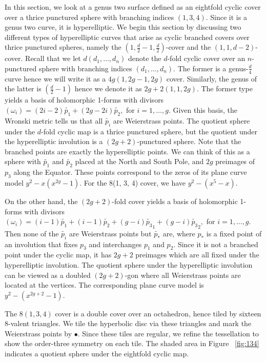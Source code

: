 \documentclass[12pt,reqno]{amsart}
\theoremstyle{definition}
\theoremstyle{remark}
\begin{document}
In this section, we look at a genus two surface defined as an eightfold cyclic cover over a thrice punctured sphere with branching indices $(1, 3, 4).$ Since it is a genus two curve, it is hyperelliptic. We begin this section by discussing two different types of hyperelliptic curves that arise as cyclic branched covers over thrice punctured spheres, namely the $(1, \frac{d}{2} - 1, \frac{d}{2})$-cover and the $(1, 1, d - 2)$-cover. Recall that we let $d (d_1, \ldots , d_n)$ denote the $d$-fold cyclic cover over an $n$-punctured sphere with branching indices $(d_1, \ldots , d_n).$ The former is a genus-$\frac{d}{4}$ curve hence we will write it as a $4 g (1, 2 g - 1, 2 g)$ cover. Similarly, the genus of the latter is $\left(\frac{d}{2} - 1\right)$ hence we denote it as $2 g + 2 (1, 1, 2 g).$ The former type yields a basis of holomorphic 1-forms with divisors $(\omega_i) = (2 i - 2) \widetilde{p_1} + (2 g - 2 i) \widetilde{p_2},$ for $i = 1, \ldots , g.$ Given this basis, the Wronski metric tells us that all $\widetilde{p_i}$ are Weierstrass points. The quotient sphere under the $d$-fold cyclic map is a thrice punctured sphere, but the quotient under the hyperelliptic involution is a $(2 g + 2)$-punctured sphere. Note that the branched points are exactly the hyperelliptic points. We can think of this as a sphere with $\widetilde{p_1}$ and $\widetilde{p_2}$ placed at the North and South Pole, and $2 g$ preimages of $p_3$ along the Equator. These points correspond to the zeros of its plane curve model $y^2 - x (x^{2 g} - 1).$ For the 8(1, 3, 4) cover, we have $y^2 - (x^5 - x).$

On the other hand, the $(2 g + 2)$-fold cover yields a basis of holomorphic 1-forms with divisors $(\omega_i) = (i - 1) \widetilde{p_1} + (i - 1) \widetilde{p_2} + (g - i) \widetilde{p_3}_1 + (g - i) \widetilde{p_3}_2,$ for $i = 1, \ldots , g.$ Then none of the $\widetilde{p_i}$ are Weierstrass points but $\widetilde{p_*}$ are, where $p_*$ is a fixed point of an involution that fixes $p_3$ and interchanges $p_1$ and $p_2.$ Since it is not a branched point under the cyclic map, it has $2 g + 2$ preimages which are all fixed under the hyperelliptic involution. The quotient sphere under the hyperelliptic involution can be viewed as a doubled $(2 g + 2)$-gon where all Weierstrass points are located at the vertices. The corresponding plane curve model is $y^2 - (x^{2 g + 2} - 1).$

The $8(1, 3, 4)$ cover is a double cover over an octahedron, hence tiled by sixteen 8-valent triangles. We tile the hyperbolic disc via these triangles and mark the Weierstrass points by $\bullet.$ Since these tiles are regular, we refine the tessellation to show the order-three symmetry on each tile. The shaded area in Figure~ \cref{fig:134} indicates a quotient sphere under the eightfold cyclic map.
\end{document}
